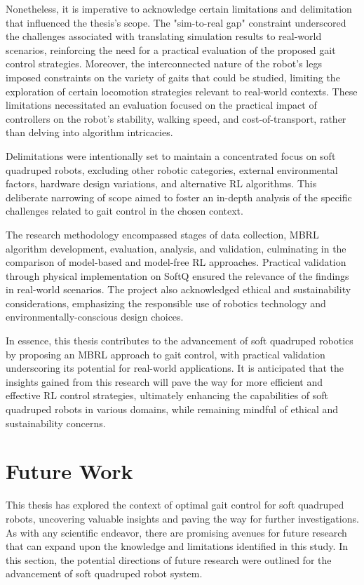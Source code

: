 Nonetheless, it is imperative to acknowledge certain limitations and delimitation that influenced the thesis's scope. The "sim-to-real gap" constraint underscored the challenges associated with translating simulation results to real-world scenarios, reinforcing the need for a practical evaluation of the proposed gait control strategies. Moreover, the interconnected nature of the robot's legs imposed constraints on the variety of gaits that could be studied, limiting the exploration of certain locomotion strategies relevant to real-world contexts. These limitations necessitated an evaluation focused on the practical impact of controllers on the robot's stability, walking speed, and cost-of-transport, rather than delving into algorithm intricacies.

Delimitations were intentionally set to maintain a concentrated focus on soft quadruped robots, excluding other robotic categories, external environmental factors, hardware design variations, and alternative RL algorithms. This deliberate narrowing of scope aimed to foster an in-depth analysis of the specific challenges related to gait control in the chosen context.

The research methodology encompassed stages of data collection, MBRL algorithm development, evaluation, analysis, and validation, culminating in the comparison of model-based and model-free RL approaches. Practical validation through physical implementation on SoftQ ensured the relevance of the findings in real-world scenarios. The project also acknowledged ethical and sustainability considerations, emphasizing the responsible use of robotics technology and environmentally-conscious design choices.

In essence, this thesis contributes to the advancement of soft quadruped robotics by proposing an MBRL approach to gait control, with practical validation underscoring its potential for real-world applications. It is anticipated that the insights gained from this research will pave the way for more efficient and effective RL control strategies, ultimately enhancing the capabilities of soft quadruped robots in various domains, while remaining mindful of ethical and sustainability concerns.

\section{Future Work}
This thesis has explored the context of optimal gait control for soft quadruped robots, uncovering valuable insights and paving the way for further investigations. As with any scientific endeavor, there are promising avenues for future research that can expand upon the knowledge and limitations identified in this study. In this section, the potential directions of future research were outlined for the advancement of soft quadruped robot system.

